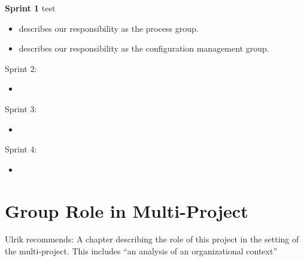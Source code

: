 \begin{documentorganization}
  \item \textbf{Sprint 1} test
  \begin{itemize}
    \item {} describes our responsibility as the process group.
    \item {} describes our responsibility as the configuration management group.
  \end{itemize}
  \item Sprint 2:
  \begin{itemize}
    \item {}
  \end{itemize}
  \item Sprint 3:
  \begin{itemize}
    \item {}
  \end{itemize}
  \item Sprint 4:
  \begin{itemize}
    \item {}
  \end{itemize}
\end{documentorganization}

\section{Group Role in Multi-Project}
Ulrik recommends: A chapter describing the role of this project in the setting of the multi-project. This includes ``an analysis of an organizational context''